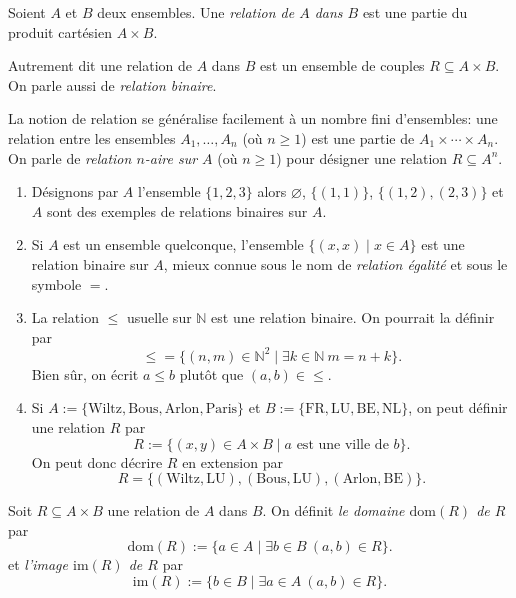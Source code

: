 \documentclass[french,course,oneside,theoremnosection]{lecture}
\newcommand{\N}{\mathbb{N}}
\newcommand{\dom}{\mathrm{dom}}
\newcommand{\im}{\mathrm{im}}
\begin{document}
\begin{definition}
Soient $A$ et $B$ deux ensembles.
Une \emph{relation de $A$ dans $B$} est une partie du produit cartésien $A \times B$.
\end{definition}
Autrement dit une relation de $A$ dans $B$ est un ensemble de couples $R \subseteq A \times B$. On parle aussi de \emph{relation binaire}.

La notion de relation se généralise facilement à un nombre fini d'ensembles: une relation entre les ensembles $A_1, \ldots, A_n$ (où $n\geq 1$) est une partie de $A_1 \times \cdots \times A_n$. On parle de \emph{relation $n$-aire sur $A$} (où $n \geq 1$) pour désigner une relation $R \subseteq A^n$.

\begin{example}\label{ex:mdf}
\begin{enumerate}[(1)]
\item Désignons par $A$ l'ensemble $\{1,2,3\}$ alors $\varnothing$, $\{(1,1)\}$, $\{(1,2), (2,3)\}$ et $A$ sont des exemples de relations binaires sur $A$. 
\item Si $A$ est un ensemble quelconque, l'ensemble $\{(x,x) \mid x \in A\}$ est une relation binaire sur $A$, mieux connue sous le nom de \emph{relation égalité} et sous le symbole $=$.
\item La relation $\leq$ usuelle sur $\N$ est une relation binaire. On pourrait la définir par 
\[
{\leq}=\{(n,m)\in \N^2 \mid \exists k \in \N \ m=n+k\}.
\]
Bien sûr, on écrit $a\leq b$ plutôt que $(a,b)\in {\leq}$.

\item\label{it:mdf} Si $A:=\{\text{Wiltz}, \text{Bous}, \text{Arlon}, \text{Paris}\}$ et $B:=\{\text{FR}, \text{LU}, \text{BE}, \text{NL}\}$, on peut définir une relation $R$ par
\[
R:=\{(x,y) \in A\times B \mid a \text{ est une ville de } b\}.
\]
On peut donc décrire $R$ en extension par
\[
R=\{(\text{Wiltz}, \text{LU}), (\text{Bous}, \text{LU}), (\text{Arlon}, \text{BE})\}.
\]
\end{enumerate}

\end{example}


\begin{definition}
Soit $R\subseteq A \times B$ une relation de $A$ dans $B$. On définit \emph{le domaine $\dom(R)$ de $R$}  par
\[
\dom(R):=\{a \in A \mid \exists b \in B \ (a,b)\in R\}.
\]
et \emph{l'image $\im(R)$ de $R$} par
\[
\im(R):=\{b \in B \mid \exists a \in A \ (a,b) \in R\}.
\]
\end{definition}
\end{document}
